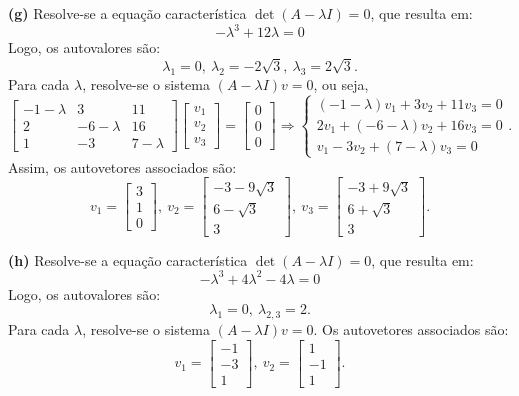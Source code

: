 \begin{resolution}
  {\bf (g)} \;
  Resolve-se a equação característica \( \det(A - \lambda I) = 0 \), que resulta em:
  \[
    -\lambda^3+12\lambda=0
  \]
  Logo, os autovalores são:
  \[
    \lambda_1=0,\:\lambda_2=-2\sqrt{3},\:\lambda_3=2\sqrt{3}.
  \]
  Para cada \(\lambda\), resolve-se o sistema \((A - \lambda I)v = 0\), ou seja,
  $$
    \begin{bmatrix}
      -1 - \lambda & 3 & 11 \\ 2 & -6 - \lambda & 16 \\ 1 & -3 & 7 - \lambda
    \end{bmatrix} \begin{bmatrix}
      v_1 \\ v_2 \\ v_3
    \end{bmatrix} = \begin{bmatrix}
      0 \\ 0 \\ 0
    \end{bmatrix} \Rightarrow
    \begin{cases}
      (-1 - \lambda) v_1 + 3 v_2 + 11 v_3 = 0 \\
      2 v_1 + (-6 - \lambda) v_2 + 16 v_3 = 0 \\
      v_1 - 3 v_2 + (7 - \lambda) v_3 = 0
    \end{cases}.
  $$
  Assim, os autovetores associados são:
  \[
    v_1 = \begin{bmatrix}3\\ 1\\ 0\end{bmatrix},\:
    v_2 =\begin{bmatrix}-3-9\sqrt{3}\\ 6-\sqrt{3}\\ 3\end{bmatrix},\:
    v_3 =\begin{bmatrix}-3+9\sqrt{3}\\ 6+\sqrt{3}\\ 3\end{bmatrix}.
  \]

  {\bf (h)} \;
  Resolve-se a equação característica \( \det(A - \lambda I) = 0 \), que resulta em:
  \[
    -\lambda^3+4\lambda^2-4\lambda=0
  \]
  Logo, os autovalores são:
  \[
    \lambda_1=0,\:\lambda_{2, 3}=2.
  \]
  Para cada \(\lambda\), resolve-se o sistema \((A - \lambda I)v = 0\). Os autovetores associados são:
  \[
    v_1 = \begin{bmatrix}-1\\ -3\\ 1\end{bmatrix},\:
    v_2 = \begin{bmatrix}1\\ -1\\ 1\end{bmatrix}.
  \]


\end{resolution}
